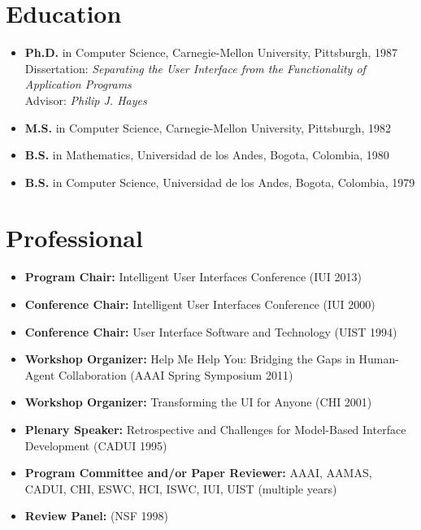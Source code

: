 \documentclass{article}
\begin{document}
\section*{Education}
\begin{itemize}
\item {\bf Ph.D.} in Computer Science, Carnegie-Mellon University,
Pittsburgh, 1987 \\
Dissertation: {\em Separating the User Interface from the Functionality of Application Programs}\\ 
Advisor: {\em Philip J. Hayes}
\item {\bf M.S.} in Computer Science, Carnegie-Mellon University, Pittsburgh,
1982
\item {\bf B.S.} in Mathematics, Universidad de los Andes, Bogota, Colombia,
1980
\item {\bf B.S.} in Computer Science, Universidad de los Andes, Bogota,
Colombia, 1979
\end{itemize}

\section*{Professional}
\begin{itemize}
\item {\bf Program Chair:} Intelligent User Interfaces Conference (IUI 2013)

\item {\bf Conference Chair:} Intelligent User Interfaces Conference (IUI 2000)

\item {\bf Conference Chair:}  User Interface Software and Technology (UIST 1994)

\item {\bf Workshop Organizer:} Help Me Help You: Bridging the Gaps in Human-Agent Collaboration 
(AAAI Spring Symposium 2011)

\item {\bf Workshop Organizer:} Transforming the UI for Anyone (CHI 2001) 

\item {\bf Plenary Speaker:} Retrospective and Challenges for Model-Based Interface Development (CADUI 1995) 

\item {\bf Program Committee and/or Paper Reviewer:} AAAI, AAMAS, CADUI, CHI, ESWC, HCI, ISWC, IUI, UIST (multiple years)

\item {\bf Review Panel:} (NSF 1998)
\end{itemize}
\end{document}
